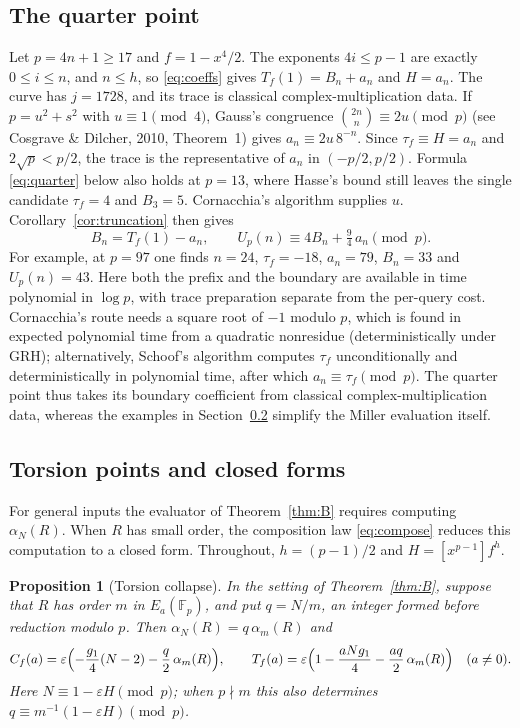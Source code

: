 \documentclass[11pt,a4paper]{article}
\numberwithin{equation}{section}
\theoremstyle{plain}
\newtheorem{proposition}[theorem]{Proposition}
\theoremstyle{definition}
\newcommand{\F}{\mathbb{F}}
\newcommand{\eps}{\varepsilon}
\begin{document}
\subsection{The quarter point}
Let $p=4n+1\ge17$ and $f=1-x^4/2$. The exponents $4i\le p-1$ are exactly $0\le i\le n$, and $n\le h$, so \eqref{eq:coeffs} gives $T_f(1)=B_n+a_n$ and $H=a_n$. The curve has $j=1728$, and its trace is classical complex-multiplication data. If $p=u^2+s^2$ with $u\equiv1\pmod4$, Gauss's congruence $\binom{2n}{n}\equiv2u\pmod p$ (see Cosgrave \& Dilcher, 2010, Theorem~1) gives $a_n\equiv2u\,8^{-n}$. Since $\tau_f\equiv H=a_n$ and $2\sqrt p<p/2$, the trace is the representative of $a_n$ in $(-p/2,p/2)$. Formula \eqref{eq:quarter} below also holds at $p=13$, where Hasse's bound still leaves the single candidate $\tau_f=4$ and $B_3=5$. Cornacchia's algorithm supplies $u$. Corollary~\ref{cor:truncation} then gives
\begin{equation}\label{eq:quarter}
B_n=T_f(1)-a_n,\qquad U_p(n)\equiv4B_n+\tfrac94\,a_n\pmod p .
\end{equation}
For example, at $p=97$ one finds $n=24$, $\tau_f=-18$, $a_n=79$, $B_n=33$ and $U_p(n)=43$. Here both the prefix and the boundary are available in time polynomial in $\log p$, with trace preparation separate from the per-query cost. Cornacchia's route needs a square root of $-1$ modulo $p$, which is found in expected polynomial time from a quadratic nonresidue (deterministically under GRH); alternatively, Schoof's algorithm computes $\tau_f$ unconditionally and deterministically in polynomial time, after which $a_n\equiv\tau_f\pmod p$. The quarter point thus takes its boundary coefficient from classical complex-multiplication data, whereas the examples in Section~\ref{sec:torsion} simplify the Miller evaluation itself.

\subsection{Torsion points and closed forms}\label{sec:torsion}
For general inputs the evaluator of Theorem~\ref{thm:B} requires computing $\alpha_N(R)$. When $R$ has small order, the composition law \eqref{eq:compose} reduces this computation to a closed form. Throughout, $h=(p-1)/2$ and $H=[x^{p-1}]f^h$.

\begin{proposition}[Torsion collapse]\label{prop:torsion}
In the setting of Theorem~\ref{thm:B}, suppose that $R$ has order $m$ in $E_a(\F_p)$, and put $q=N/m$, an integer formed before reduction modulo $p$. Then $\alpha_N(R)=q\,\alpha_m(R)$ and
\begin{equation}\label{eq:torsion}
C_f(a)=\eps\Bigl(-\frac{g_1}{4}(N-2)-\frac{q}{2}\,\alpha_m(R)\Bigr),\qquad
T_f(a)=\eps\Bigl(1-\frac{aNg_1}{4}-\frac{aq}{2}\,\alpha_m(R)\Bigr)\quad(a\neq0).
\end{equation}
Here $N\equiv1-\eps H\pmod p$; when $p\nmid m$ this also determines $q\equiv m^{-1}(1-\eps H)\pmod p$.
\end{proposition}
\end{document}
